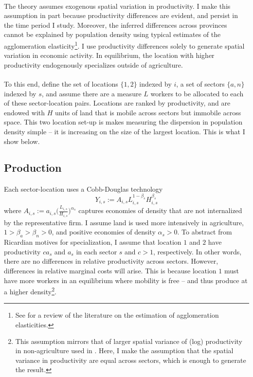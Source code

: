 \documentclass[]{article}
\theoremstyle{plain}
\begin{document}
\paragraph*{}
 The theory assumes exogenous spatial variation in productivity. I make this assumption in part because productivity differences are evident, and persist in the time period I study.  Moreover, the inferred differences across provinces cannot be explained by population density using typical estimates of the agglomeration elasticity\footnote{See \citet{combesg2015} for a review of the literature on the estimation of agglomeration elasticities.}. I use productivity differences solely to generate spatial variation in economic activity. In equilibrium, the location with higher productivity endogenously specializes outside of agriculture.

\paragraph*{}
To this end, define the set of locations $\{1, 2\}$ indexed by $i$, a set of sectors $\{a, n\}$ indexed by $s$, and assume there are a measure $L$ workers to be allocated to each of these sector-location pairs. Locations are ranked by productivity, and are endowed with $H$ units of land that is mobile across sectors but immobile across space.  This two location set-up is makes measuring the dispersion in population density simple -- it is increasing on the size of the largest location. This is what I show below.

\subsection*{Production}
\paragraph*{}
 Each sector-location uses a Cobb-Douglas technology
\begin{equation*}
	Y_{i, s} := A_{i, s}L_{i, s}^{1-\beta_{s}}H_{i, s}^{\beta_{s}}
\end{equation*}
where $A_{i,s} := a_{i, s}\big(\frac{L_{i, s}}{H_{i, s}}\big)^{\alpha_{s}}$ captures economies of density that are not internalized by the representative firm. I assume land is used more intensively in agriculture, $1 >\beta_{a} > \beta_{n} > 0$, and positive economies of density $\alpha_{s} > 0$.  To abstract from Ricardian motives for specialization, I assume that location $1$ and $2$ have productivity $ca_{s}$ and $a_{s}$ in each sector $s$ and $c>1$, respectively. In other words, there are no differences in relative productivity across sectors. However, differences in relative marginal costs will arise. This is because location $1$ must have more workers in an equilibrium where mobility is free -- and thus produce at a higher density\footnote{This assumption mirrors that of larger spatial variance of (log) productivity in non-agriculture used in \cite{urbstruct}. Here, I make the assumption that the spatial variance in productivity are equal across sectors, which is enough to generate the result.}. 
\end{document}
